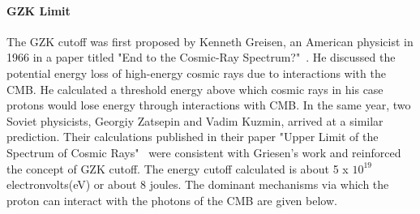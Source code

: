\paragraph{GZK Limit} 
The GZK cutoff was first proposed by Kenneth Greisen, an American physicist in 1966 in a paper titled "End to the Cosmic-Ray Spectrum?"~\cite{}. He discussed the potential energy loss of high-energy cosmic rays due to interactions with the CMB. He calculated a threshold energy above which cosmic rays in his case protons would lose energy through interactions with CMB. In the same year, two Soviet physicists, Georgiy Zatsepin and Vadim Kuzmin, arrived at a similar prediction. Their calculations published in their paper "Upper Limit of the Spectrum of Cosmic Rays"~\cite{} were consistent with Griesen's work and reinforced the concept of GZK cutoff.  
The energy cutoff calculated is about 5 x $10^{19}$ electronvolts(eV) or about 8 joules. The dominant mechanisms via which the proton can interact with the photons of the CMB are given below. 

